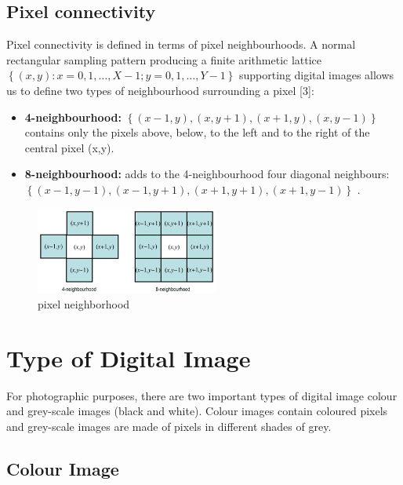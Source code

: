 \subsection{Pixel connectivity}\label{subsec:pixel-connectivity}

Pixel connectivity is defined in terms of pixel neighbourhoods.
A normal rectangular sampling pattern producing a finite arithmetic lattice
$\left\{ (x,y) : x = 0,1, \ldots ,X-1; y = 0,1,\ldots ,Y-1 \right\}$ supporting digital
images allows us to define two types of neighbourhood surrounding a pixel [3]:

        \begin{itemize}
                \item \textbf{4-neighbourhood:} $\left\{ (x-1,y), (x,y+1), (x+1,y), (x,y-1) \right\}$ contains only the pixels above, below, to the left and to the right of the central pixel (x,y).
                \item \textbf{8-neighbourhood:} adds to the 4-neighbourhood four diagonal neighbours: $\left\{ (x-1,y-1), (x-1,y+1), (x+1,y+1), (x+1,y-1) \right\}$ .
        \end{itemize}

        \begin{figure}[h]
                \centering
                \includegraphics[width=6cm]{chapiter1/figures/neighbour.png}
                \setlength{\fboxrule}{2pt}
                \caption{pixel neighborhood}
        \end{figure}

\section{Type of Digital Image}\label{sec:type-of-digital-image}

For photographic purposes, there are two important types of digital image colour and grey-scale images (black and white).
Colour images contain coloured pixels and grey-scale images are made of pixels in different shades of grey.

\subsection{Colour Image}

